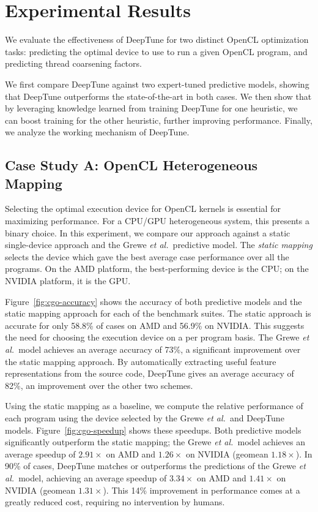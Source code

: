 \section{Experimental Results} \label{sec:results}

We evaluate the effectiveness of DeepTune for two distinct OpenCL optimization
tasks: predicting the optimal device to use to run a given OpenCL program, and
predicting thread coarsening factors.

We first compare DeepTune against two expert-tuned predictive models, showing
that DeepTune outperforms the state-of-the-art in both cases. We then show that
by leveraging knowledge learned from training DeepTune for one heuristic, we can
boost training for the other heuristic, further improving performance. Finally,
we analyze the working mechanism of DeepTune.


\subsection{Case Study A: OpenCL Heterogeneous Mapping}

Selecting the optimal execution device for OpenCL kernels is essential for
maximizing performance. For a CPU/GPU heterogeneous system, this presents a
binary choice. In this experiment, we compare our approach against a static
single-device approach and the Grewe \emph{et al.\ }predictive model. The
\emph{static mapping} selects the device which gave the best average case
performance over all the programs. On the AMD platform, the best-performing
device is the CPU; on the NVIDIA platform, it is the GPU.

Figure~\ref{fig:cgo-accuracy} shows the accuracy of both predictive models and
the static mapping approach for each of the benchmark suites. The static
approach is accurate for only 58.8\% of cases on AMD and 56.9\% on NVIDIA. This
suggests the need for choosing the execution device on a per program basis. The
Grewe \emph{et al.\ }model achieves an average accuracy of 73\%, a significant
improvement over the static mapping approach. By automatically extracting useful
feature representations from the source code, DeepTune gives an average accuracy
of 82\%, an improvement over the other two schemes.

Using the static mapping as a baseline, we compute the relative performance of
each program using the device selected by the Grewe \emph{et al.\ }and DeepTune
models. Figure~\ref{fig:cgo-speedup} shows these speedups. Both predictive
models significantly outperform the static mapping; the Grewe \emph{et al.\
}model achieves an average speedup of $2.91\times$ on AMD and $1.26\times$ on
NVIDIA (geomean $1.18\times$). In 90\% of cases, DeepTune matches or outperforms
the predictions of the Grewe \emph{et al.\ }model, achieving an average speedup
of $3.34\times$ on AMD and $1.41\times$ on NVIDIA (geomean $1.31\times$). This
14\% improvement in performance comes at a greatly reduced cost, requiring no
intervention by humans.

